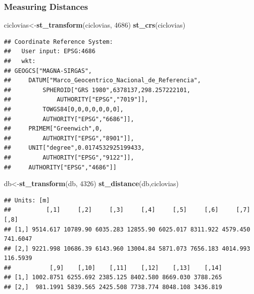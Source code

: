 \documentclass[
  shownotes,
  xcolor={svgnames},
  hyperref={colorlinks,citecolor=DarkBlue,linkcolor=DarkRed,urlcolor=DarkBlue}
   , aspectratio=169]{beamer}
\newenvironment{Shaded}{\begin{snugshade}}{\end{snugshade}}
\newcommand{\DecValTok}[1]{\textcolor[rgb]{0.00,0.00,0.81}{#1}}
\newcommand{\KeywordTok}[1]{\textcolor[rgb]{0.13,0.29,0.53}{\textbf{#1}}}
\newcommand{\NormalTok}[1]{#1}
\begin{document}
\begin{frame}[fragile]
\frametitle{Measuring Distances}

\begin{scriptsize}
\begin{Shaded}
\begin{Highlighting}[]
\NormalTok{ciclovias\textless{}{-}}\KeywordTok{st\_transform}\NormalTok{(ciclovias, }\DecValTok{4686}\NormalTok{)}
\KeywordTok{st\_crs}\NormalTok{(ciclovias)}
\end{Highlighting}
\end{Shaded}
\begin{tiny}
\begin{verbatim}
## Coordinate Reference System:
##   User input: EPSG:4686 
##   wkt:
## GEOGCS["MAGNA-SIRGAS",
##     DATUM["Marco_Geocentrico_Nacional_de_Referencia",
##         SPHEROID["GRS 1980",6378137,298.257222101,
##             AUTHORITY["EPSG","7019"]],
##         TOWGS84[0,0,0,0,0,0,0],
##         AUTHORITY["EPSG","6686"]],
##     PRIMEM["Greenwich",0,
##         AUTHORITY["EPSG","8901"]],
##     UNIT["degree",0.0174532925199433,
##         AUTHORITY["EPSG","9122"]],
##     AUTHORITY["EPSG","4686"]]
\end{verbatim}
\end{tiny}
\begin{Shaded}
\begin{Highlighting}[]
\NormalTok{db\textless{}{-}}\KeywordTok{st\_transform}\NormalTok{(db, }\DecValTok{4326}\NormalTok{)}
\KeywordTok{st\_distance}\NormalTok{(db,ciclovias)}
\end{Highlighting}
\end{Shaded}

\begin{verbatim}
## Units: [m]
##          [,1]     [,2]     [,3]     [,4]     [,5]     [,6]     [,7]     [,8]
## [1,] 9514.617 10789.90 6035.283 12855.90 6025.017 8311.922 4579.450 741.6047
## [2,] 9221.998 10686.39 6143.960 13004.84 5871.073 7656.183 4014.993 116.5939
##           [,9]    [,10]    [,11]    [,12]    [,13]    [,14]
## [1,] 1002.8751 6255.692 2385.125 8402.580 8669.030 3788.265
## [2,]  981.1991 5839.565 2425.508 7738.774 8048.108 3436.819
\end{verbatim}
\end{scriptsize}
\end{frame}
\end{document}
